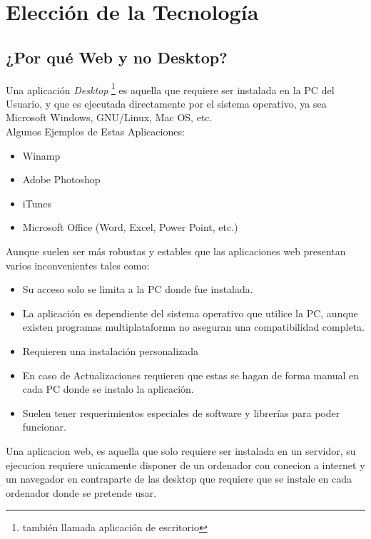 ﻿\chapter{Elección de la Tecnología}

\section{¿Por qué Web y no Desktop?}

Una aplicación \textit{Desktop} \footnote{también llamada aplicación de escritorio} es aquella que requiere ser instalada en la PC del Usuario, y que es ejecutada directamente por el sistema operativo, ya sea Microsoft Windows, GNU/Linux, Mac OS, etc.\\[0.1cm]

Algunos Ejemplos de Estas Aplicaciones:

\begin{itemize}
    \item Winamp
    \item Adobe Photoshop
    \item iTunes
    \item Microsoft Office (Word, Excel, Power Point, etc.)
\end{itemize}

Aunque suelen ser más robustas y estables que las aplicaciones web presentan varios inconvenientes tales como:

\begin{itemize}
    \item Su acceso solo se limita a la PC donde fue instalada.
    \item La aplicación es dependiente del sistema operativo que utilice la PC, aunque existen programas multiplataforma no aseguran una compatibilidad completa.
    \item Requieren una instalación personalizada
    \item En caso de Actualizaciones requieren que estas se hagan de forma manual en cada PC  donde se instalo la aplicación.
    \item Suelen tener requerimientos especiales de software y librerías para poder funcionar.
\end{itemize}


Una aplicacion web, es aquella que solo requiere ser instalada en un servidor, su ejecucion requiere unicamente disponer de un ordenador con conecion a internet y un navegador en contraparte de las desktop que requiere que se instale en cada ordenador donde se pretende usar. \\[0.1cm]


